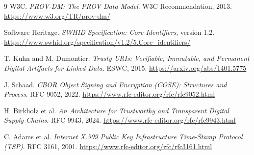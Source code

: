 \documentclass[11pt]{article}
\begin{document}
\begin{thebibliography}{9}
W3C. \emph{PROV-DM: The PROV Data Model}. W3C Recommendation, 2013. \url{https://www.w3.org/TR/prov-dm/}

Software Heritage. \emph{SWHID Specification: Core Identifiers}, version 1.2. \url{https://www.swhid.org/specification/v1.2/5.Core_identifiers/}

T. Kuhn and M. Dumontier. \emph{Trusty URIs: Verifiable, Immutable, and Permanent Digital Artifacts for Linked Data}. ESWC, 2015. \url{https://arxiv.org/abs/1401.5775}

J. Schaad. \emph{CBOR Object Signing and Encryption (COSE): Structures and Process}. RFC 9052, 2022. \url{https://www.rfc-editor.org/rfc/rfc9052.html}

H. Birkholz et al. \emph{An Architecture for Trustworthy and Transparent Digital Supply Chains}. RFC 9943, 2024. \url{https://www.rfc-editor.org/rfc/rfc9943.html}

C. Adams et al. \emph{Internet X.509 Public Key Infrastructure Time-Stamp Protocol (TSP)}. RFC 3161, 2001. \url{https://www.rfc-editor.org/rfc/rfc3161.html}
\end{thebibliography}
\end{document}
